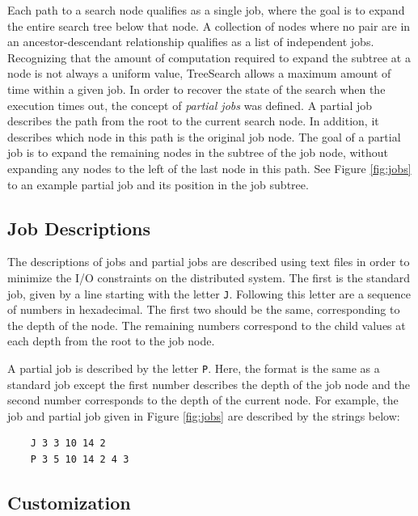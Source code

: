 \documentclass[11pt]{article}
\def\TreeSearch{{TreeSearch}}
\begin{document}
Each path to a search node qualifies as a single job, where the goal 
	is to expand the entire search tree below that node.
A collection of nodes where no pair are in an ancestor-descendant relationship 
	qualifies as a list of independent jobs.
Recognizing that the amount of computation required to expand 
	the subtree at a node is not always a uniform value,
	{\TreeSearch} allows a maximum amount of time 
	within a given job.
In order to recover the state of the search when the execution times out,
	the concept of \emph{partial jobs} was defined.
A partial job describes the path from the root to the current search node.
In addition, it describes which node in this path is the original job node.
The goal of a partial job is to expand the remaining nodes in the
	subtree of the job node, without expanding any nodes to 
	the left of the last  node in this path.
See Figure \ref{fig:jobs} to an example partial job and its position in the
	job subtree.

\subsection{Job Descriptions}


The descriptions of jobs and partial jobs are described using text files
	in order to minimize the I/O constraints on the distributed system.
The first is the standard job, given by a line starting with the letter \texttt{J}.
Following this letter are a sequence of numbers in hexadecimal.
The first two should be the same, corresponding to the depth of the node.
The remaining numbers correspond to the child values at each depth from the root to the job node.

A partial job is described by the letter \texttt{P}.
Here, the format is the same as a standard job except the first number describes the depth of the job node
	and the second number corresponds to 
	the depth of the current node.
For example, the job and partial job given in Figure \ref{fig:jobs} are described by the strings below:

\begin{verbatim}
    J 3 3 10 14 2
    P 3 5 10 14 2 4 3
\end{verbatim}

\subsection{Customization}
\end{document}
